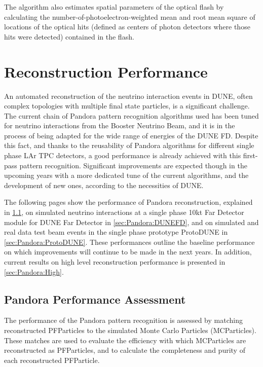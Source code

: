 The algorithm also estimates spatial parameters of the optical flash
by calculating the number-of-photoelectron-weighted mean and 
root mean square of locations of the optical hits
(defined as centers of photon detectors where those hits were detected)
contained in the flash.

\section{Reconstruction Performance}
\label{sec:performance}

An automated reconstruction of the neutrino interaction events in DUNE, often complex topologies with multiple final state particles, is a significant challenge. The current chain of Pandora pattern recognition algorithms used has been tuned for neutrino interactions from the Booster Neutrino Beam, and it is in the process of being adapted for the wide range of energies of the DUNE FD. Despite this fact, and thanks to the reusability of Pandora algorithms for different single phase LAr TPC detectors, a good performance is already achieved with this first-pass pattern recognition. Significant improvements are expected though in the upcoming years with a more dedicated tune of the current algorithms, and the development of new ones, according to the necessities of DUNE. 

The following pages show the performance of Pandora reconstruction, explained in \ref{sec:Pandora:assessment}, on simulated neutrino interactions at a single phase 10kt Far Detector module for DUNE Far Detector in \ref{sec:Pandora:DUNEFD}, and on simulated and real data test beam events in the single phase prototype ProtoDUNE in \ref{sec:Pandora:ProtoDUNE}. These performances outline the baseline performance on which improvements will continue to be made in the next years. In addition, current results on high level reconstruction performance is presented in  \ref{sec:Pandora:High}.

\subsection{Pandora Performance Assessment}
\label{sec:Pandora:assessment}
The performance of the Pandora pattern recognition is assessed by matching reconstructed PFParticles to the simulated Monte Carlo Particles (MCParticles). These matches are used to evaluate the efficiency with which MCParticles are reconstructed as PFParticles, and to calculate the completeness and purity of each reconstructed PFParticle. 

